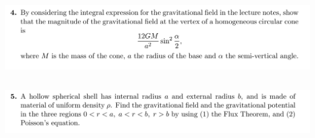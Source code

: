 \documentclass[12pt]{article}
\begin{document}
\subsection{}
\begin{mdframed}
\includegraphics[width=400pt]{img/oxford-prelims-M5-multivariable-calc-8-4.png}
\end{mdframed}

\subsection{}
\begin{mdframed}
\includegraphics[width=400pt]{img/oxford-prelims-M5-multivariable-calc-8-5.png}
\end{mdframed}
\end{document}
